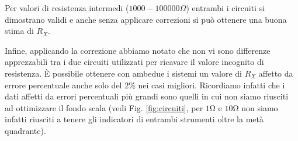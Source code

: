 Per valori di resistenza intermedi ($1000-100000 \Omega$) entrambi i circuiti si dimostrano validi e anche senza applicare correzioni si può ottenere una buona stima di $R_X$.

Infine, applicando la correzione abbiamo notato che non vi sono differenze apprezzabili tra i due circuiti utilizzati per ricavare il valore incognito di resistenza. È possibile ottenere con ambedue i sistemi un valore di $R_X$ affetto da errore percentuale anche solo del $2\%$ nei casi migliori. Ricordiamo infatti che i dati affetti da errori percentuali più grandi sono quelli in cui non siamo riusciti ad ottimizzare il fondo scala (vedi Fig. \ref{fig:circuiti}, per $1\si{\ohm}$ e $10\si{\ohm}$ non siamo infatti riusciti a tenere gli indicatori di entrambi strumenti oltre la metà quadrante). %

